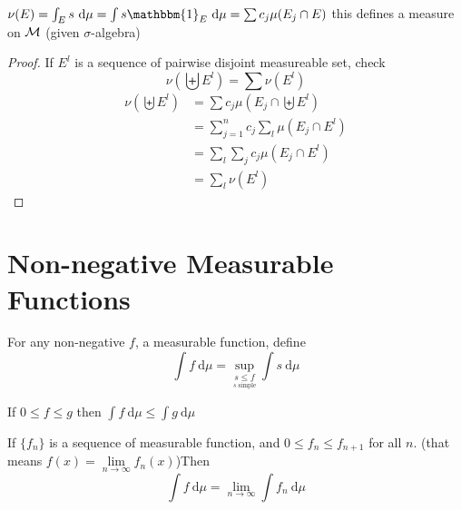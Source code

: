 \begin{lemma}\label{lem:measure-from-set}
  $\nu(E) = \int_E s \ \mathrm{d}\mu = \int s \mathbbm{1}_E\ \mathrm{d}\mu = \sum c_j \mu(E_j \cap E)$
  this defines a measure on $\mathcal M$ (given $\sigma$-algebra)
\end{lemma}

\begin{proof}
  If $E^l$ is a sequence of pairwise disjoint measureable set, check
  \[\nu\left(\biguplus E^l\right) = \sum \nu(E^l)\] 
  \begin{align*}
    \nu\left(\biguplus E^l\right) &= \sum c_j \mu(E_j \cap \biguplus E^l) \\
    &= \sum_{j=1}^n c_j \sum_l \mu(E_j \cap E^l) \\
    &= \sum_l \sum_j c_j \mu(E_j \cap E^l) \\
    &= \sum_l \nu(E^l)
  \end{align*}
\end{proof}

\section{Non-negative Measurable Functions}

\begin{definition}
  For any non-negative $f$, a measurable function, define
  \[\int f \ \mathrm{d}\mu = \sup_{\underset{s \text{ simple}}{s \le f}} \int s \ \mathrm{d}\mu\]
\end{definition}

\begin{remark}
  If $0 \le f \leq g$ then $\int f \ \mathrm{d}\mu \leq \int g \ \mathrm{d}\mu$
\end{remark}

\begin{theorem}
  If $\{f_n\}$ is a sequence of measurable function, and $0 \le f_n \le f_{n+1}$ for all $n$. 
  (that means $f(x) = \lim\limits_{n\to\infty}f_n(x)$)Then
  \[\int f\ \mathrm{d}\mu = \lim_{n\to\infty}\int f_n\ \mathrm{d}\mu\]
\end{theorem}

